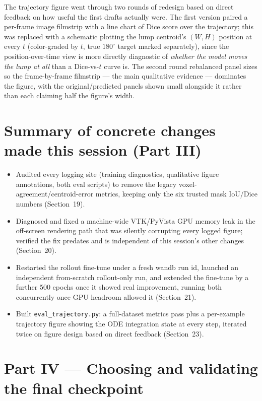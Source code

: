 \documentclass[11pt]{article}
\newcommand{\hsec}[1]{\section*{\color{hdrblue}#1}}
\begin{document}
The trajectory figure went through two rounds of redesign based on direct feedback on how
useful the first drafts actually were. The first version paired a per-frame image filmstrip
with a line chart of Dice score over the trajectory; this was replaced with a schematic
plotting the lump centroid's $(W,H)$ position at every $t$ (color-graded by $t$, true $180^\circ$
target marked separately), since the position-over-time view is more directly diagnostic of
\emph{whether the model moves the lump at all} than a Dice-vs-$t$ curve is. The second round
rebalanced panel sizes so the frame-by-frame filmstrip --- the main qualitative evidence ---
dominates the figure, with the original/predicted panels shown small alongside it rather than
each claiming half the figure's width.

\hsec{Summary of concrete changes made this session (Part III)}
\begin{itemize}[nosep]
\item Audited every logging site (training diagnostics, qualitative figure annotations, both
  eval scripts) to remove the legacy voxel-agreement/centroid-error metrics, keeping only the
  six trusted mask IoU/Dice numbers (Section~19).
\item Diagnosed and fixed a machine-wide VTK/PyVista GPU memory leak in the off-screen
  rendering path that was silently corrupting every logged figure; verified the fix predates
  and is independent of this session's other changes (Section~20).
\item Restarted the rollout fine-tune under a fresh wandb run id, launched an independent
  from-scratch rollout-only run, and extended the fine-tune by a further 500 epochs once it
  showed real improvement, running both concurrently once GPU headroom allowed it
  (Section~21).
\item Built \texttt{eval\_trajectory.py}: a full-dataset metrics pass plus a per-example
  trajectory figure showing the ODE integration state at every step, iterated twice on figure
  design based on direct feedback (Section~23).
\end{itemize}

\hsec{Part IV --- Choosing and validating the final checkpoint}
\end{document}
